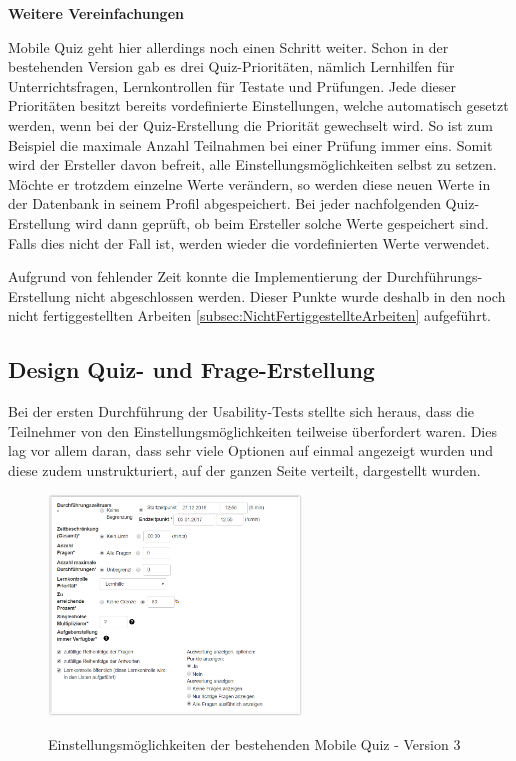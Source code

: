 \bigskip\bigskip

\textbf{Weitere Vereinfachungen}
\bigskip

Mobile Quiz geht hier allerdings noch einen Schritt weiter. Schon in der bestehenden Version gab es drei Quiz-Prioritäten, nämlich Lernhilfen für Unterrichtsfragen, Lernkontrollen für Testate und Prüfungen. Jede dieser Prioritäten besitzt bereits vordefinierte Einstellungen, welche automatisch gesetzt werden, wenn bei der Quiz-Erstellung die Priorität gewechselt wird. So ist zum Beispiel die maximale Anzahl Teilnahmen bei einer Prüfung immer eins. Somit wird der Ersteller davon befreit, alle Einstellungsmöglichkeiten selbst zu setzen. Möchte er trotzdem einzelne Werte verändern, so werden diese neuen Werte in der Datenbank in seinem Profil abgespeichert. Bei jeder nachfolgenden Quiz-Erstellung wird dann geprüft, ob beim Ersteller solche Werte gespeichert sind. Falls dies nicht der Fall ist, werden wieder die vordefinierten Werte verwendet. 

\bigskip\bigskip

Aufgrund von fehlender Zeit konnte die Implementierung der Durchführungs-Erstellung nicht abgeschlossen werden. Dieser Punkte wurde deshalb in den noch nicht fertiggestellten Arbeiten \ref{subsec:NichtFertiggestellteArbeiten} aufgeführt.





\subsection{Design Quiz- und Frage-Erstellung}
Bei der ersten Durchführung der \gls{Usability-Test}s stellte sich heraus, dass die Teilnehmer von den Einstellungsmöglichkeiten teilweise überfordert waren. Dies lag vor allem daran, dass sehr viele Optionen auf einmal angezeigt wurden und diese zudem unstrukturiert, auf der ganzen Seite verteilt, dargestellt wurden.


\begin{figure}[H]
	\centering
	\includegraphics[width=0.6\textwidth]{Images/Einstellungen_alt.PNG}
	\caption{Einstellungsmöglichkeiten der bestehenden Mobile Quiz - Version 3}
	\cite{mobilequiz.ch}
\end{figure}


